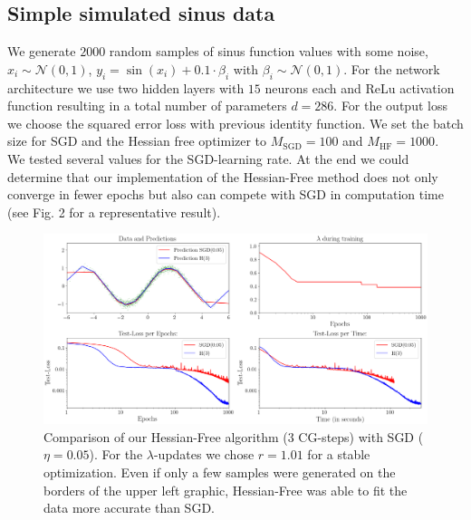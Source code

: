 \documentclass[conference]{IEEEtran}
\begin{document}
	\subsection{Simple simulated sinus data}
	\noindent
	We generate $2000$ random samples of sinus function values with some noise, $x_{i}\sim\mathcal{N}(0, 1)$, $y_{i}=\sin(x_{i})+0.1\cdot\beta_{i}$ with  $\beta_{i}\sim\mathcal{N}(0,1)$. For the network architecture we use two hidden layers with $15$ neurons each and ReLu activation function resulting in a total number of parameters $d=286$. For the output loss we choose the squared error loss with previous identity function. We set the batch size for SGD and the Hessian free optimizer to $M_{\mathrm{SGD}}=100$ and $M_{\mathrm{HF}}=1000$.\\
	We tested several values for the SGD-learning rate. At the end we could determine that our implementation of the Hessian-Free method does not only converge in fewer epochs but also can compete with SGD in computation time (see Fig. 2 for a representative result).
	
	
	\begin{figure}[tb]
		\centering
		\includegraphics[width=\textwidth]{toy_005.png}
		\caption{Comparison of our Hessian-Free algorithm (3 CG-steps) with SGD ($\eta=0.05$). For the $\lambda$-updates we chose $r=1.01$ for a stable optimization. Even if only a few samples were generated on the borders of the upper left graphic, Hessian-Free was able to fit the data more accurate than SGD.}
		\label{fig2}
	\end{figure}
	
\end{document}
